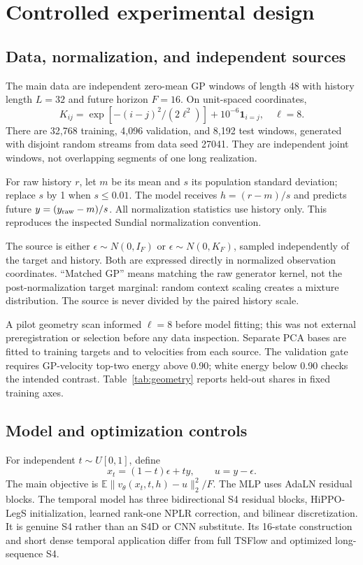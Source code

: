 \documentclass[10pt,twocolumn]{article}
\newcommand{\E}{\mathbb{E}}
\begin{document}
\clearpage
\section{Controlled experimental design}
\subsection{Data, normalization, and independent sources}
The main data are independent zero-mean GP windows of length 48 with history length $L=32$ and future horizon $F=16$. On unit-spaced coordinates,
\begin{equation}
 K_{ij}=\exp[-(i-j)^2/(2\ell^2)]+10^{-6}\mathbf{1}_{i=j},\quad\ell=8.
\end{equation}
There are 32,768 training, 4,096 validation, and 8,192 test windows, generated with disjoint random streams from data seed 27041. They are independent joint windows, not overlapping segments of one long realization.

For raw history $r$, let $m$ be its mean and $s$ its population standard deviation; replace $s$ by 1 when $s\leq0.01$. The model receives $h=(r-m)/s$ and predicts future $y=(y_{\rm raw}-m)/s$. All normalization statistics use history only. This reproduces the inspected Sundial normalization convention.

The source is either $\epsilon\sim N(0,I_F)$ or $\epsilon\sim N(0,K_F)$, sampled independently of the target and history. Both are expressed directly in normalized observation coordinates. ``Matched GP'' means matching the raw generator kernel, not the post-normalization target marginal: random context scaling creates a mixture distribution. The source is never divided by the paired history scale.

A pilot geometry scan informed $\ell=8$ before model fitting; this was not external preregistration or selection before any data inspection. Separate PCA bases are fitted to training targets and to velocities from each source. The validation gate requires GP-velocity top-two energy above 0.90; white energy below 0.90 checks the intended contrast. Table~\ref{tab:geometry} reports held-out shares in fixed training axes.
\begin{table}[h]
\centering\small
\caption{Held-out top-two energy $E_2$. No test-fitted PCA axes.}\label{tab:geometry}
\end{table}


\subsection{Model and optimization controls}
For independent $t\sim U[0,1]$, define
\begin{equation}
 x_t=(1-t)\epsilon+ty,\qquad u=y-\epsilon.
\end{equation}
The main objective is $\E\|v_\theta(x_t,t,h)-u\|_2^2/F$. The MLP uses AdaLN residual blocks. The temporal model has three bidirectional S4 residual blocks, HiPPO-LegS initialization, learned rank-one NPLR correction, and bilinear discretization. It is genuine S4 rather than an S4D or CNN substitute. Its 16-state construction and short dense temporal application differ from full TSFlow and optimized long-sequence S4.
\end{document}
